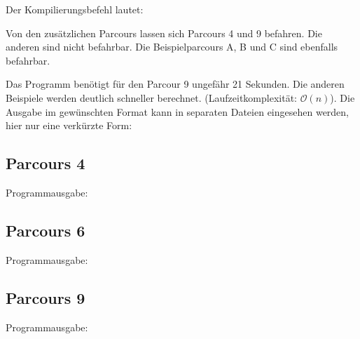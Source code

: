 Der Kompilierungsbefehl lautet:


Von den zusätzlichen Parcours lassen sich Parcours 4 und 9 befahren. Die anderen sind nicht befahrbar. Die Beispielparcours A, B und C sind ebenfalls befahrbar.

Das Programm benötigt für den Parcour 9 ungefähr 21 Sekunden. Die anderen Beispiele werden deutlich schneller berechnet. (Laufzeitkomplexität: \(\mathcal O(n)\)).
Die Ausgabe im gewünschten Format kann in separaten Dateien eingesehen werden, hier nur eine verkürzte Form:
\subsection{Parcours 4}
	Programmausgabe:\\
\subsection{Parcours 6}
	Programmausgabe:\\
\subsection{Parcours 9}
	Programmausgabe:\\


